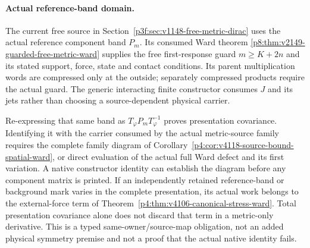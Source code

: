 \documentclass[12pt,a4paper]{article}
\begin{document}
\paragraph{Actual reference-band domain.}
The current free source in
Section~\ref{p3f:sec:v1148-free-metric-dirac} uses the actual reference
component band $P_m$. Its consumed Ward theorem
\ref{p8:thm:v2149-guarded-free-metric-ward} supplies the free first-response
guard $m\ge K+2n$ and its stated support, force, state and contact
conditions. Its parent multiplication words are compressed only at the
outside; separately compressed products require the actual guard.
The generic interacting finite constructor consumes $J$ and its jets
rather than choosing a source-dependent physical carrier.

Re-expressing that same band as $T_\varphi P_mT_\varphi^{-1}$ proves
presentation covariance. Identifying it with the carrier consumed by
the actual metric-source family requires the complete family diagram
of Corollary~\ref{p4:cor:v4118-source-bound-spatial-ward}, or direct
evaluation of the actual full Ward defect and its first variation.
A native constructor identity can establish the diagram before any
component matrix is printed. If an independently retained reference-band
or background mark varies in the complete presentation, its actual work
belongs to the external-force term of
Theorem~\ref{p4:thm:v4106-canonical-stress-ward}. Total presentation
covariance alone does not discard that term in a metric-only derivative.
This is a typed same-owner/source-map obligation, not an added physical
symmetry premise and not a proof that the actual native identity fails.
\end{document}
